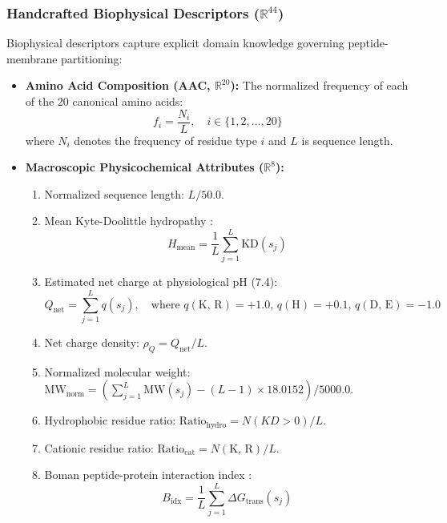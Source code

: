 \documentclass[11pt,a4paper]{article}
\begin{document}
\subsubsection{Handcrafted Biophysical Descriptors ($\mathbb{R}^{44}$)}
Biophysical descriptors capture explicit domain knowledge governing peptide-membrane partitioning:
\begin{itemize}
    \item \textbf{Amino Acid Composition (AAC, $\mathbb{R}^{20}$):} The normalized frequency of each of the 20 canonical amino acids:
    \begin{equation}
        f_i = \frac{N_i}{L}, \quad i \in \{1, 2, \dots, 20\}
    \end{equation}
    where $N_i$ denotes the frequency of residue type $i$ and $L$ is sequence length.
    \item \textbf{Macroscopic Physicochemical Attributes ($\mathbb{R}^{8}$):}
    \begin{enumerate}
        \item Normalized sequence length: $L / 50.0$.
        \item Mean Kyte-Doolittle hydropathy \cite{kyte1982simple}:
        \begin{equation}
            H_{\text{mean}} = \frac{1}{L} \sum_{j=1}^{L} \text{KD}(s_j)
        \end{equation}
        \item Estimated net charge at physiological pH (7.4):
        \begin{equation}
            Q_{\text{net}} = \sum_{j=1}^{L} q(s_j), \quad \text{where } q(\text{K, R}) = +1.0, \, q(\text{H}) = +0.1, \, q(\text{D, E}) = -1.0
        \end{equation}
        \item Net charge density: $\rho_Q = Q_{\text{net}} / L$.
        \item Normalized molecular weight: $\text{MW}_{\text{norm}} = (\sum_{j=1}^L \text{MW}(s_j) - (L-1)\times 18.0152) / 5000.0$.
        \item Hydrophobic residue ratio: $\text{Ratio}_{\text{hydro}} = N(KD > 0) / L$.
        \item Cationic residue ratio: $\text{Ratio}_{\text{cat}} = N(\text{K, R}) / L$.
        \item Boman peptide-protein interaction index \cite{boman2003antibacterial}:
        \begin{equation}
            B_{\text{idx}} = \frac{1}{L} \sum_{j=1}^{L} \Delta G_{\text{trans}}(s_j)
        \end{equation}

\end{enumerate}
\end{itemize}
\end{document}
